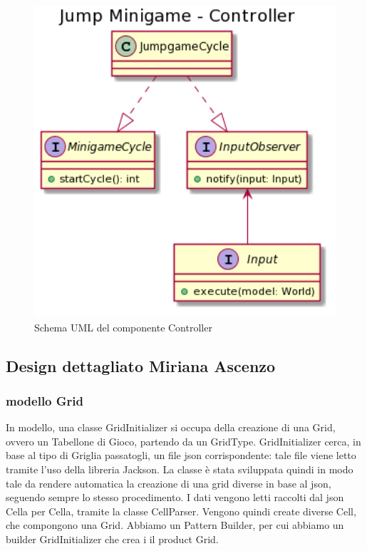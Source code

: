 \documentclass[a4paper,12pt]{report}
\begin{document}
    \begin{figure}[!t]
        \centering{}
        \includegraphics[width=150mm]{images/picchiotti/jumpcontroller.png}
        \caption{Schema UML del componente Controller}
        \label{img:jumpcontroller}
    \end{figure}

	\subsection{Design dettagliato Miriana Ascenzo}
    \subsubsection {modello Grid}
	In modello, una classe GridInitializer si occupa della creazione di una Grid, ovvero un Tabellone di Gioco, partendo da un GridType.
	GridInitializer cerca, in base al tipo di Griglia passatogli, un file json corrispondente: tale file viene letto tramite l'uso della libreria Jackson.
	La classe è stata sviluppata quindi in modo tale da rendere automatica la creazione di una grid diverse in base al json, seguendo sempre lo stesso procedimento.
	I dati vengono letti raccolti dal json Cella per Cella, tramite la classe CellParser.
	Vengono quindi create diverse Cell, che compongono una Grid.
    Abbiamo un Pattern Builder, per cui abbiamo un builder GridInitializer che crea i il product Grid.
\end{document}
